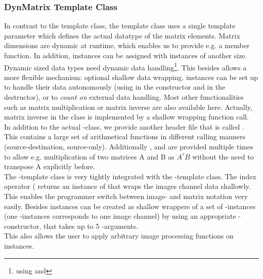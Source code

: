\subsubsection{DynMatrix Template Class}

In contrast to the  template class, the  template class uses a single template parameter which defines the actual datatype of the matrix elements. Matrix dimensions are dynamic at runtime, which enables us to provide e.g. a  member function. In addition,  instances can be assigned with  instances of another size. Dynamic sized data types need dynamic data handling\footnote{using  and }. This besides allows a more flexible mechanism: optional shallow data wrapping.  instances can be set up to handle their data autonomously (using  in the constructor and  in the destructor), or to \emph{count on} external data handling. Most other functionalities such as matrix multiplication or matrix inverse are also available here. Actually, matrix inverse in the  class is implemented by a shallow wrapping  function call.\\
In addition to the actual -class, we provide another header file that is called . This contains a large set of arithmetical functions in different calling manners (source-destination, source-only). Additionally ,  and  are provided multiple times to allow e.g. multiplication of two matrices A and B as $A^{\tau}B$ without the need to transpose A explicitly before.\\[10pt]
The -template class is very tightly integrated with the  -template class. The index operator ( returns an instance of  that wraps the images channel data shallowly. This enables the programmer switch between image- and matrix notation very easily. Besides  instances can be created as shallow wrappers of a set of -instances (one -instances corresponds to one image channel) by using an appropriate -constructor, that takes up to 5 -arguments.\\
This also allows the user to apply arbitrary image processing functions on  instances.




